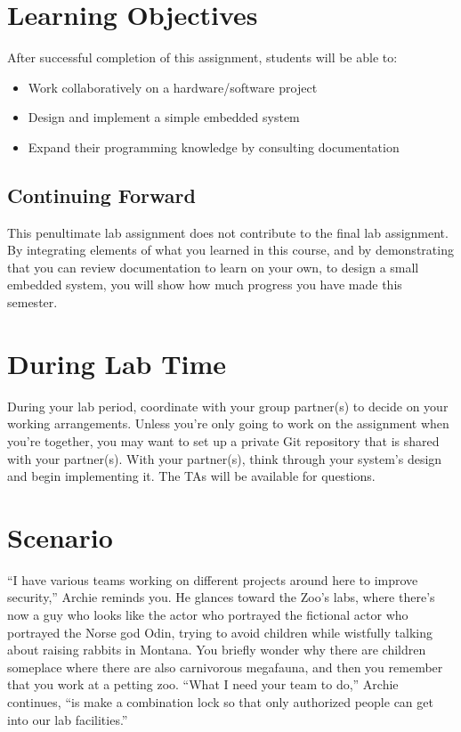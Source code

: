 \section*{Learning Objectives}

After successful completion of this assignment, students will be able to:
\begin{itemize}
\item Work collaboratively on a hardware/software project
\item Design and implement a simple embedded system
\item Expand their programming knowledge by consulting documentation
\end{itemize}

\subsection*{Continuing Forward}

This penultimate lab assignment does not contribute to the final lab assignment.
By integrating elements of what you learned in this course, and by demonstrating
that you can review documentation to learn on your own, to design a small
embedded system, you will show how much progress you have made this semester.

\section*{During Lab Time}

During your lab period, coordinate with your group partner(s) to decide on your
working arrangements. Unless you're only going to work on the assignment when
you're together, you may want to set up a private Git repository that is shared
with your partner(s). With your partner(s), think through your system's design
and begin implementing it. The TAs will be available for questions.

\softwareengineeringfrontmatter

\section{Scenario}

``I have various teams working on different projects around here to improve
security,'' Archie reminds you. He glances toward the Zoo's labs, where there's
now a guy who looks like the actor who portrayed the fictional actor who
portrayed the Norse god Odin, trying to avoid children while wistfully talking
about raising rabbits in Montana. You briefly wonder why there are children
someplace where there are also carnivorous megafauna, and then you remember that
you work at a petting zoo. ``What I need your team to do,'' Archie continues,
``is make a combination lock so that only authorized people can get into our lab
facilities.''

